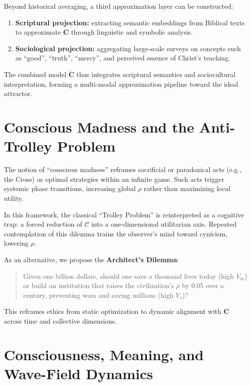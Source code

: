 \documentclass[11pt,a4paper]{article}
\theoremstyle{definition}
\theoremstyle{remark}
\begin{document}
Beyond historical averaging, a third approximation layer can be constructed:
\begin{enumerate}
    \item \textbf{Scriptural projection:} extracting semantic embeddings from Biblical texts to approximate $\mathbf{C}$ through linguistic and symbolic analysis.
    \item \textbf{Sociological projection:} aggregating large-scale surveys on concepts such as ``good'', ``truth'', ``mercy'', and perceived essence of Christ's teaching.
\end{enumerate}

The combined model $\tilde{\mathbf{C}}$ thus integrates scriptural semantics and sociocultural interpretation, forming a multi-modal approximation pipeline toward the ideal attractor.


\section{Conscious Madness and the Anti-Trolley Problem}

The notion of ``conscious madness'' reframes sacrificial or paradoxical acts (e.g., the Cross) as optimal strategies within an infinite game. Such acts trigger systemic phase transitions, increasing global $\rho$ rather than maximizing local utility.

In this framework, the classical ``Trolley Problem'' is reinterpreted as a cognitive trap: a forced reduction of $\mathcal{C}$ into a one-dimensional utilitarian axis. Repeated contemplation of this dilemma trains the observer's mind toward cynicism, lowering $\rho$.

As an alternative, we propose the \textbf{Architect’s Dilemma}:
\begin{quote}
Given one billion dollars, should one save a thousand lives today (high $V_m$) or build an institution that raises the civilization’s $\bar{\rho}$ by 0.05 over a century, preventing wars and saving millions (high $V_s$)?
\end{quote}

This reframes ethics from static optimization to dynamic alignment with $\mathbf{C}$ across time and collective dimensions.



\section{Consciousness, Meaning, and Wave-Field Dynamics}
\end{document}
